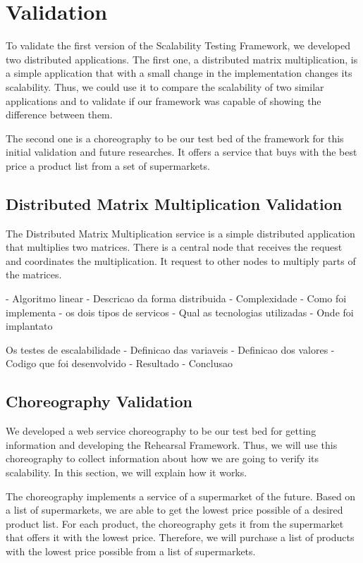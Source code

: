 \section{Validation}
To validate the first version of the Scalability Testing Framework, we developed two distributed applications. The first one, a distributed matrix multiplication, is a simple application that with a small change in the implementation changes its scalability. Thus, we could use it to compare the scalability of two similar applications and to validate if our framework was capable of showing the difference between them.

The second one is a choreography to be our test bed of the framework for this initial validation and future researches. It offers a service that buys with the best price a product list from a set of supermarkets.

\subsection{Distributed Matrix Multiplication Validation}

The Distributed Matrix Multiplication service is a simple distributed application that multiplies two matrices. There is a central node that receives the request and coordinates the multiplication. It request to other nodes to multiply parts of the matrices.

- Algoritmo linear
- Descricao da forma distribuida
- Complexidade
- Como foi implementa
	- os dois tipos de servicos
- Qual as tecnologias utilizadas
- Onde foi implantato

Os testes de escalabilidade
- Definicao das variaveis
- Definicao dos valores
- Codigo que foi desenvolvido
- Resultado
- Conclusao

\subsection{Choreography Validation}
We developed a web service choreography to be our test bed for getting information and developing the Rehearsal Framework. Thus, we will use this choreography to collect information about how we are going to verify its scalability. In this section, we will explain how it works.

The choreography implements a service of a supermarket of the future. Based on a list of supermarkets, we are able to get the lowest price possible of a desired product list. For each product, the choreography gets it from the supermarket that offers it with the lowest price. Therefore, we will purchase a list of products with the lowest price possible from a list of supermarkets.

